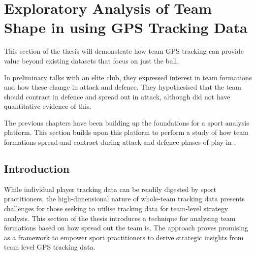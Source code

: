 \pagebreak %

\section{Exploratory Analysis of Team Shape in \afl{} using GPS Tracking Data}
\label{sec:shapepaper}

This section of the thesis will demonstrate how team GPS tracking can provide value beyond existing datasets that focus on just the ball. %

In preliminary talks with an elite \afl{} club, they expressed interest in team formations and how these change in attack and defence. They hypothesised that the team should contract in defence and spread out in attack, although did not have quantitative evidence of this.

The previous chapters have been building up the foundations for a sport analysis platform. This section builds upon this platform to perform a study of how team formations spread and contract during attack and defence phases of play in \afl{}.


\subsection{Introduction}

While individual player tracking data can be readily digested by sport practitioners, the high-dimensional nature of whole-team tracking data presents challenges for those seeking to utilise tracking data for team-level strategy analysis. This section of the thesis %
introduces a technique for analysing team formations based on how spread out the team is. The approach proves promising as a framework to empower sport practitioners to derive strategic insights from team level GPS tracking data.


